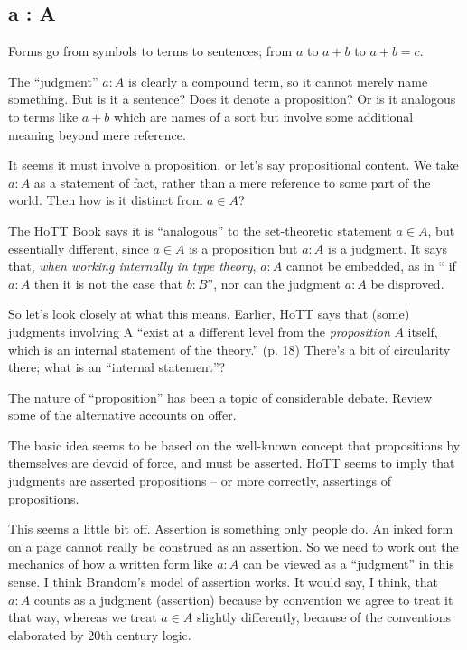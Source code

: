 \subsection{a : A}
\label{subs:aA}

Forms go from symbols to terms to sentences; from \(a\) to \(a+b\) to
\(a+b=c\).

The ``judgment'' \(a : A\) is clearly a compound term, so it cannot
merely name something.  But is it a sentence?  Does it denote a
proposition?  Or is it analogous to terms like \(a+b\) which are names
of a sort but involve some additional meaning beyond mere reference.

It seems it must involve a proposition, or let's say propositional
content.  We take \(a : A\) as a statement of fact, rather than a mere
reference to some part of the world.  Then how is it distinct from
\(a\in A\)?

The HoTT Book says it is ``analogous'' to the set-theoretic statement
\(a\in A\), but essentially different, since \(a\in A\) is a
proposition but \(a : A\) is a judgment.  It says that, \textit{when
  working internally in type theory}, \(a : A\) cannot be embedded, as
in `` if \(a : A\) then it is not the case that \(b : B\)'', nor can
the judgment \(a : A\) be disproved.

So let's look closely at what this means.  Earlier, HoTT says that
(some) judgments involving A ``exist at a different level from the
\textit{proposition} \(A\) itself, which is an internal statement of
the theory.''  (p. 18) There's a bit of circularity there; what is an
``internal statement''?

{\todo The nature of ``proposition'' has been a topic of
  considerable debate.  Review some of the alternative accounts on
  offer.}


The basic idea seems to be based on the well-known concept that
propositions by themselves are devoid of force, and must be asserted.
HoTT seems to imply that judgments are asserted propositions -- or
more correctly, assertings of propositions.

This seems a little bit off.  Assertion is something only people do.
An inked form on a page cannot really be construed as an assertion.
So we need to work out the mechanics of how a written form like \(a :
A\) can be viewed as a ``judgment'' in this sense.  I think Brandom's
model of assertion works.  It would say, I think, that \(a : A\)
counts as a judgment (assertion) because by convention we agree to
treat it that way, whereas we treat \(a\in A\) slightly differently,
because of the conventions elaborated by 20th century logic.

